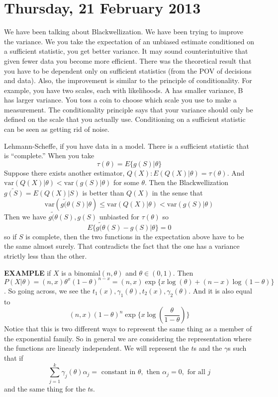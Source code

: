 \documentclass[letterpaper, 12pt]{article}
\theoremstyle{definition}
\theoremstyle{plain}
\newcommand{\var}{\text{var}}
\begin{document}
\section{Thursday, 21 February 2013}
We have been talking about Blackwellization. We have been trying to improve the variance. We you take the expectation of an unbiased estimate conditioned on a sufficient statistic, you get better variance. It may sound counterintuitive that given fewer data you become more efficient. There was the theoretical result that you have to be dependent only on sufficient statistics (from the POV of decisions and data). Also, the improvement is similar to the principle of conditionality. For example, you have two scales, each with likelihoods. A has smaller variance, B has larger variance. You toss a coin to choose which scale you use to make a measurement. The conditionality principle says that your variance should only be defined on the scale that you actually use. Conditioning on a sufficient statistic can be seen as getting rid of noise.

Lehmann-Scheffe, if you have data in a model. There is a sufficient statistic that is ``complete.'' When you take
\begin{equation}
\tau(\theta) = E \{ g(S) | \theta \}
\end{equation}
Suppose there exists another estimator, $Q(X) : E(Q(X) | \theta) = \tau(\theta)$. And $\var (Q(X) | \theta) < \var (g(S) | \theta)$ for some $\theta$. Then the Blackwellization $\tilde{g(S)} = E(Q(X) | S)$ is better than $Q(X)$ in the sense that 
\[
\var (\tilde{g(\theta} (S) | \theta) \leq \var (Q(X) | \theta) < \var(g(S) | \theta)
\]
Then we have $\tilde{g(\theta} (S), g(S)$ unbiasted for $\tau(\theta)$ so 
\[
E \{ \tilde{g(\theta} (S) - g(S) |\theta  \} = 0
\]
so if $S$ is complete, then the two functions in the expectation above have to be the same almost surely. That contradicts the fact that the one has a variance strictly less than the other.

\bigskip
\textbf{EXAMPLE} if $X$ is a binomial$(n,\theta)$ and $\theta \in (0,1)$. Then $P(X| \theta) = (n,x) \theta^x(1 - \theta)^{n-x}=(n,x) \exp\{x \log(\theta) + (n-x) \log( 1 - \theta)\}$. So going across, we see the $t_1 (x), \gamma_1(\theta), t_2(x), \gamma_2(\theta)$. And it is also equal to 
\[
(n,x) (1 - \theta)^n \exp\{ x \log (  \frac{\theta}{1-\theta}  )\}
\]
Notice that this is two different ways to represent the same thing as a member of the exponential family.
So in general we are considering the representation where the functions are linearly independent. We will represent the $t$s and the $\gamma$s such that if 
\[
\sum_{j=1}^k \gamma_j (\theta) \alpha_j = \text{ constant in } \theta, \text{ then } \alpha_j = 0, \text { for all } j
\]
and the same thing for the $t$s.
\end{document}
